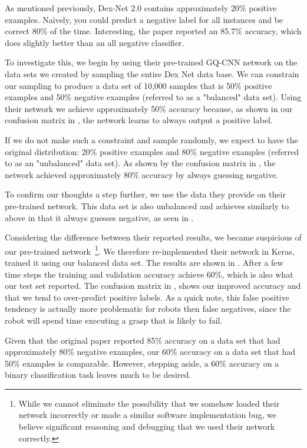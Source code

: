 As mentioned previously, Dex-Net 2.0 contains approximately 20\% positive examples. 
Na{\"i}vely, you could predict a negative label for all instances and be correct 80\% of the time. Interesting, the paper reported an 85.7\% accuracy, which does slightly better than an all negative classifier. 

To investigate this, we begin by using their pre-trained GQ-CNN network  on the data sets we created by sampling the entire Dex Net data base. 
We can constrain our sampling to produce a data set of 10,000 samples that is 50\% positive examples and 50\% negative examples (referred to as a "balanced" data set). 
Using their network we achieve approximately 50\% accuracy because, as shown in our confusion matrix in , the network learns to always output a positive label. 

If we do not make such a constraint and sample randomly, we expect to have the original distribution: 20\% positive examples and 80\% negative examples (referred to as an "unbalanced" data set). 
As shown by the confusion matrix in , the network achieved approximately 80\% accuracy by always guessing negative. 

To confirm our thoughts a step further, we use the data they provide on their pre-trained network. 
This data set is also unbalanced and achieves similarly to above in that it always guesses negative, as seen in . 

Considering the difference between their reported results, we became suspicious of our pre-trained network~\footnote{While we cannot eliminate the possibility that we somehow loaded their network incorrectly or made a similar software implementation bug, we believe significant reasoning and debugging that we used their network correctly.}.
We therefore re-implemented their network in Keras, trained it using our balanced data set. 
The results are shown in . 
After a few time steps the training and validation accuracy achieve 60\%, which is also what our test set reported. 
The confusion matrix in , shows our improved accuracy and that we tend to over-predict positive labels. 
As a quick note, this false positive tendency is actually more problematic for robots then false negatives, since the robot will spend time executing a grasp that is likely to fail. 

Given that the original paper reported 85\% accuracy on a data set that had approximately 80\% negative examples, our 60\% accuracy on a data set that had 50\% examples is comparable. 
However, stepping aside, a 60\% accuracy on a binary classification task leaves much to be desired. 

